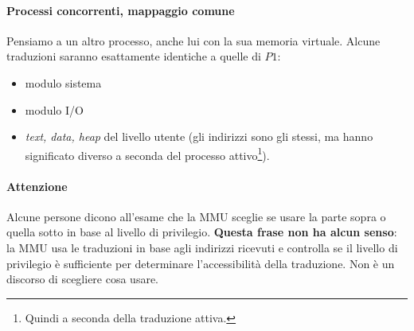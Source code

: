 \documentclass[11pt]{report}
\theoremstyle{definition}
\begin{document}
\paragraph{Processi concorrenti, mappaggio comune}
Pensiamo a un altro processo, anche lui con la sua memoria virtuale. Alcune traduzioni saranno esattamente identiche a quelle di $P1$:
\begin{itemize}
	\item modulo sistema
	\item modulo I/O
	\item \textit{text, data, heap} del livello utente (gli indirizzi sono gli stessi, ma hanno significato diverso a seconda del processo attivo\footnote{Quindi a seconda della traduzione attiva.}).
\end{itemize}
\paragraph{Attenzione} Alcune persone dicono all'esame che la MMU sceglie se usare la parte sopra o quella sotto in base al livello di privilegio. \textbf{Questa frase non ha alcun senso}: la MMU usa le traduzioni in base agli indirizzi ricevuti e controlla se il livello di privilegio è sufficiente per determinare l'accessibilità della traduzione. Non è un discorso di scegliere cosa usare.

\end{document}
